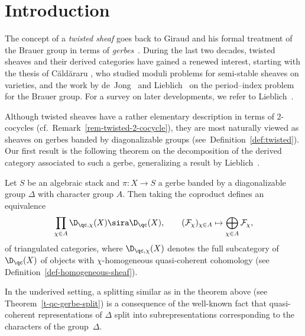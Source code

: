 \section{Introduction}

The concept of a \emph{twisted sheaf} goes
back to Giraud 
and his formal treatment of the Brauer group in terms of \emph{gerbes}~\cite[Section~V.4]{giraud1971}.
During the last two decades,
twisted sheaves and their derived categories have gained a renewed interest,
starting with the thesis of C{\u{a}}ld{\u{a}}raru \cite{caldararu2000},
who studied moduli problems for semi-stable sheaves on varieties,
and the work by de~Jong~\cite{dejong2004}
and Lieblich~\cite{lieblich2004, lieblich2015}
on the period--index problem for the Brauer group.
For a survey on later developments,
we refer to Lieblich~\cite[Section~4]{lieblich2017}.

Although twisted sheaves have a rather elementary description in terms of 2-cocycles
(cf.~Remark~\ref{rem-twisted-2-cocycle}),
they are most naturally viewed as sheaves on gerbes banded by diagonalizable groups
(see~Definition~\ref{def:twisted}).
Our first result is the following theorem on the decomposition of the derived category associated to such a gerbe,
generalizing a result by Lieblich~\cite[Section~2.2.4]{lieblich2004}.

\begin{mtheorem}
  \label{t:chi-splitting-D-qc-X-intro}
  Let $S$ be an algebraic stack and 
  $\pi\colon X \to S$ a gerbe banded by a diagonalizable group
  $\Delta$ 
  with character group $A$.
  Then taking the coproduct defines an equivalence 
  \begin{equation}
    \label{eq-equivalence-derived-intro}
    \prod_{\chi \in A} \D_{\qc, \chi}(X) \sira \D_\qc(X),
    \qquad
    (\mathcal{F}_\chi)_{\chi \in A} 
    \mapsto 
    \bigoplus_{\chi \in A} \mathcal{F}_\chi,
  \end{equation}
  of triangulated categories,
  where $\D_{\qc, \chi}(X)$ denotes the full subcategory of
  $\D_\qc(X)$ of objects with $\chi$-homogeneous quasi-coherent
  cohomology (see Definition~\ref{def-homogeneous-sheaf}).
\end{mtheorem}

In the underived setting, 
a splitting similar as in the theorem above (see Theorem~\ref{t-qc-gerbe-split})
is a consequence of the well-known fact that quasi-coherent
representations of $\Delta$ split into subrepresentations
corresponding to the characters of the group~$\Delta$.


